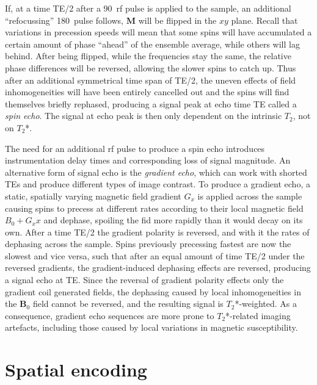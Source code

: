 \documentclass[12pt,phd,a4paper,twoside]{ucl_thesis}
\begin{document}
If, at a time TE/2 after a 90\textdegree\ \gls{rf} pulse is applied to the sample, an additional ``refocussing'' 180\textdegree\ pulse follows, $\textbf{M}$ will be flipped in the $xy$ plane.
Recall that variations in precession speeds will mean that some spins will have accumulated a certain amount of phase ``ahead'' of the ensemble average, while others will lag behind.
After being flipped, while the frequencies stay the same, the relative phase differences will be reversed, allowing the slower spins to catch up.
Thus after an additional symmetrical time span of TE/2, the uneven effects of field inhomogeneities will have been entirely cancelled out and the spins will find themselves briefly rephased, producing a signal peak at echo time TE called a \textit{spin echo}.
The signal at echo peak is then only dependent on the intrinsic $T_2$, not on $T_2$*.

The need for an additional \gls{rf} pulse to produce a spin echo introduces instrumentation delay times and corresponding loss of signal magnitude.
An alternative form of signal echo is the \textit{gradient echo}, which can work with shorted TEs and produce different types of image contrast.
To produce a gradient echo, a static, spatially varying magnetic field gradient $G_x$ is applied across the sample causing spins to precess at different rates according to their local magnetic field $B_0 + G_xx$ and dephase, spoiling the \gls{fid} more rapidly than it would decay on its own.
After a time TE/2 the gradient polarity is reversed, and with it the rates of dephasing across the sample.
Spins previously precessing fastest are now the slowest and vice versa, such that after an equal amount of time TE/2 under the reversed gradients, the gradient-induced dephasing effects are reversed, producing a signal echo at TE.
Since the reversal of gradient polarity effects only the gradient coil generated fields, the dephasing caused by local inhomogeneities in the $\mathbf{B}_0$ field cannot be reversed, and the resulting signal is $T_2$*-weighted.
As a consequence, gradient echo sequences are more prone to $T_2$*-related imaging artefacts, including those caused by local variations in magnetic susceptibility.

\section{Spatial encoding}
\end{document}

